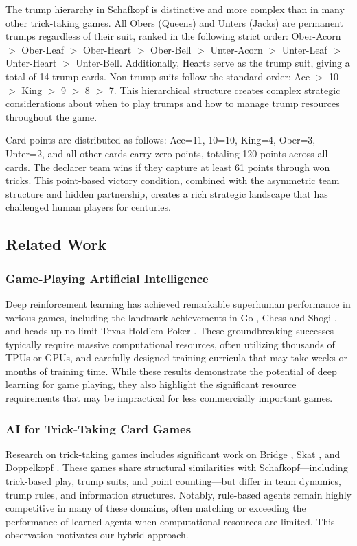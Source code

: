 \documentclass[conference]{IEEEtran}
\begin{document}
The trump hierarchy in Schafkopf is distinctive and more complex than in many other trick-taking games. All Obers (Queens) and Unters (Jacks) are permanent trumps regardless of their suit, ranked in the following strict order: Ober-Acorn $>$ Ober-Leaf $>$ Ober-Heart $>$ Ober-Bell $>$ Unter-Acorn $>$ Unter-Leaf $>$ Unter-Heart $>$ Unter-Bell. Additionally, Hearts serve as the trump suit, giving a total of 14 trump cards. Non-trump suits follow the standard order: Ace $>$ 10 $>$ King $>$ 9 $>$ 8 $>$ 7. This hierarchical structure creates complex strategic considerations about when to play trumps and how to manage trump resources throughout the game.

Card points are distributed as follows: Ace=11, 10=10, King=4, Ober=3, Unter=2, and all other cards carry zero points, totaling 120 points across all cards. The declarer team wins if they capture at least 61 points through won tricks. This point-based victory condition, combined with the asymmetric team structure and hidden partnership, creates a rich strategic landscape that has challenged human players for centuries.

\subsection{Related Work}

\subsubsection{Game-Playing Artificial Intelligence}
Deep reinforcement learning has achieved remarkable superhuman performance in various games, including the landmark achievements in Go \cite{silver2016mastering}, Chess and Shogi \cite{silver2017mastering}, and heads-up no-limit Texas Hold'em Poker \cite{brown2019superhuman}. These groundbreaking successes typically require massive computational resources, often utilizing thousands of TPUs or GPUs, and carefully designed training curricula that may take weeks or months of training time. While these results demonstrate the potential of deep learning for game playing, they also highlight the significant resource requirements that may be impractical for less commercially important games.

\subsubsection{AI for Trick-Taking Card Games}
Research on trick-taking games includes significant work on Bridge \cite{tian2020joint}, Skat \cite{kupferschmid2006skat}, and Doppelkopf \cite{doppelkopf2019}. These games share structural similarities with Schafkopf—including trick-based play, trump suits, and point counting—but differ in team dynamics, trump rules, and information structures. Notably, rule-based agents remain highly competitive in many of these domains, often matching or exceeding the performance of learned agents when computational resources are limited. This observation motivates our hybrid approach.
\end{document}
